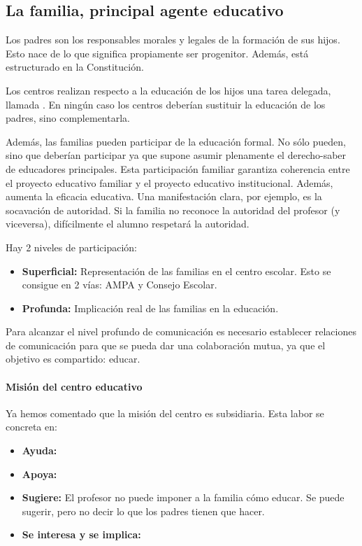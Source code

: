 \documentclass[palatino]{apuntesURJC}
\begin{document}
\subsection{La familia, principal agente educativo}

Los padres son los responsables morales y legales de la formación de sus hijos. 
%
Esto nace de lo que significa propiamente ser progenitor.
%
Además, está estructurado en la Constitución.

Los centros realizan respecto a la educación de los hijos una tarea delegada, llamada .
%
En ningún caso los centros deberían sustituir la educación de los padres, sino complementarla.

Además, las familias pueden participar de la educación formal. 
%
No sólo pueden, sino que deberían participar ya que supone asumir plenamente el derecho-saber de educadores principales.
%
Esta participación familiar garantiza coherencia entre el proyecto educativo familiar y el proyecto educativo institucional. 
%
Además, aumenta la eficacia educativa.
%
Una manifestación clara, por ejemplo, es la socavación de autoridad. 
%
Si la familia no reconoce la autoridad del profesor (y viceversa), difícilmente el alumno respetará la autoridad.

Hay 2 niveles de participación:
\begin{itemize}
	\item \textbf{Superficial:} Representación de las familias en el centro escolar. 
	Esto se consigue en 2 vías: AMPA y Consejo Escolar.
	\item \textbf{Profunda:} Implicación real de las familias en la educación.
\end{itemize}


Para alcanzar el nivel profundo de comunicación es necesario establecer relaciones de comunicación para que se pueda dar una colaboración mutua, ya que el objetivo es compartido: educar.

\paragraph{Misión del centro educativo}

Ya hemos comentado que la misión del centro es subsidiaria. Esta labor se concreta en:

\begin{itemize}
	\item \textbf{Ayuda:} 
	\item \textbf{Apoya:}
	\item \textbf{Sugiere:} El profesor no puede imponer a la familia cómo educar. Se puede sugerir, pero no decir lo que los padres tienen que hacer.
	\item \textbf{Se interesa y se implica:}
\end{itemize}
\end{document}

